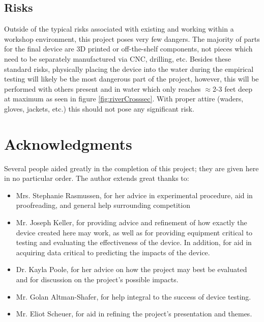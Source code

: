\documentclass[fleqn,10pt]{SelfArx} %
\begin{document}
	\subsection{Risks}
	Outside of the typical risks associated with existing and working within a workshop environment, this project poses very few dangers. The majority of parts for the final device are 3D printed or off-the-shelf components, not pieces which need to be separately manufactured via CNC, drilling, etc. Besides these standard risks, physically placing the device into the water during the empirical testing will likely be the most dangerous part of the project, however, this will be performed with others present and in water which only reaches $\approx$2-3 feet deep at maximum as seen in figure \ref{fig:riverCrosssec}. With proper attire (waders, gloves, jackets, etc.) this should not pose any significant risk.
	
	
	\section*{Acknowledgments} %
	Several people aided greatly in the completion of this project; they are given here in no particular order. The author extends great thanks to:
	\begin{itemize}
		\item Mrs. Stephanie Rasmussen, for her advice in experimental procedure, aid in proofreading, and general help surrounding competition
		\item Mr. Joseph Keller, for providing advice and refinement of how exactly the device created here may work, as well as for providing equipment critical to testing and evaluating the effectiveness of the device. In addition, for aid in acquiring data critical to predicting the impacts of the device.
		\item Dr. Kayla Poole, for her advice on how the project may best be evaluated and for discussion on the project's possible impacts.
		\item Mr. Golan Altman-Shafer, for help integral to the success of device testing.
		\item Mr. Eliot Scheuer, for aid in refining the project's presentation and themes.
	\end{itemize}
	
	
	
	
	\nocite{*}
	
	
	
\end{document}
